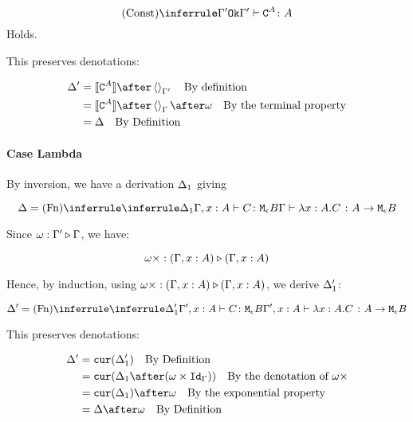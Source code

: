 {    \begin{equation}
        \ntreeruleI{Const}{\ok{\G'}}{\typerelation{\G'}{\const{A}}{A}}
    \end{equation}
    Holds.
    
    This preserves denotations:
    
    
    \begin{align}
        \D' & = \deno{\const{A}} \after \term{\G'}\qt{By definition}\\
        & = \deno{\const{A}} \after \term{\G}\after \w \qt{By the terminal property}\\
        & = \D\qt{By Definition}\\
    \end{align}
    
    
    \paragraph{Case Lambda}
    By inversion, we have a derivation $\Delta_1$ giving
    
    \begin{equation}
        \D = \ntreeruleI{Fn}{
            \treeruleI{\D_1}{\typerelation{\gax}{C}{\meb}}
        }{\gtyperelation{\lam{x}{A}{C}}{\aeb}}
    \end{equation}
    
    Since $\omega : \Gamma' \triangleright \Gamma$, we have:
    
    \begin{equation}
        \omega\times : (\Gamma,x:  A) \triangleright (\Gamma, x: A)
    \end{equation}
    
    Hence, by induction, using $\omega\times : (\Gamma,x:  A) \triangleright (\Gamma, x: A)$, we derive $\Delta_1'$:
    
    \begin{equation}
        \D' = \ntreeruleI{Fn}{
            \treeruleI{\D_1'}{\typerelation{\G',x: A}{C}{\meb}}
        }{\typerelation{\G',x: A}{\lam{x}{A}{C}}{\aeb}}
    \end{equation}
    
    This preserves denotations:
    
    
    \begin{align}
    \D' & = \cur{\D_1'} \qt{By Definition}\\
    & = \cur{\D_1\after(\w\times \idg)}\qt{By the denotation of $\w\x$} \\
    &= \cur{\D_1}\after\w\qt{By the exponential property}\\
    &= \D\after \w \qt{By Definition}
    \end{align}
    
}
